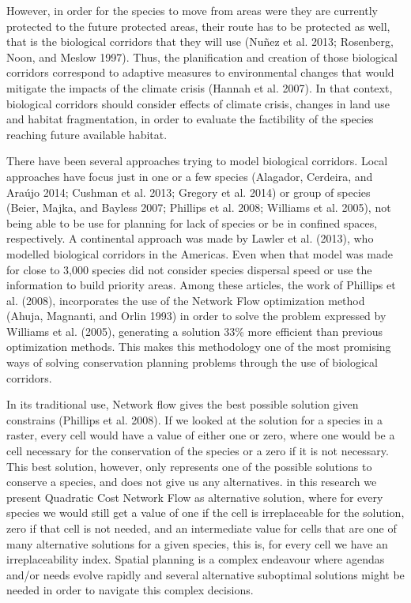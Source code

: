 \documentclass[]{article}
\begin{document}
However, in order for the species to move from areas were they are currently protected to the future protected areas, their route has to be protected as well, that is the biological corridors that they will use (Nuñez et al. 2013; Rosenberg, Noon, and Meslow 1997). Thus, the planification and creation of those biological corridors correspond to adaptive measures to environmental changes that would mitigate the impacts of the climate crisis (Hannah et al. 2007). In that context, biological corridors should consider effects of climate crisis, changes in land use and habitat fragmentation, in order to evaluate the factibility of the species reaching future available habitat.

There have been several approaches trying to model biological corridors. Local approaches have focus just in one or a few species (Alagador, Cerdeira, and Araújo 2014; Cushman et al. 2013; Gregory et al. 2014) or group of species (Beier, Majka, and Bayless 2007; Phillips et al. 2008; Williams et al. 2005), not being able to be use for planning for lack of species or be in confined spaces, respectively. A continental approach was made by Lawler et al. (2013), who modelled biological corridors in the Americas. Even when that model was made for close to 3,000 species did not consider species dispersal speed or use the information to build priority areas. Among these articles, the work of Phillips et al. (2008), incorporates the use of the Network Flow optimization method (Ahuja, Magnanti, and Orlin 1993) in order to solve the problem expressed by Williams et al. (2005), generating a solution 33\% more efficient than previous optimization methods. This makes this methodology one of the most promising ways of solving conservation planning problems through the use of biological corridors.

In its traditional use, Network flow gives the best possible solution given constrains (Phillips et al. 2008). If we looked at the solution for a species in a raster, every cell would have a value of either one or zero, where one would be a cell necessary for the conservation of the species or a zero if it is not necessary. This best solution, however, only represents one of the possible solutions to conserve a species, and does not give us any alternatives. in this research we present Quadratic Cost Network Flow as alternative solution, where for every species we would still get a value of one if the cell is irreplaceable for the solution, zero if that cell is not needed, and an intermediate value for cells that are one of many alternative solutions for a given species, this is, for every cell we have an irreplaceability index. Spatial planning is a complex endeavour where agendas and/or needs evolve rapidly and several alternative suboptimal solutions might be needed in order to navigate this complex decisions.
\end{document}
